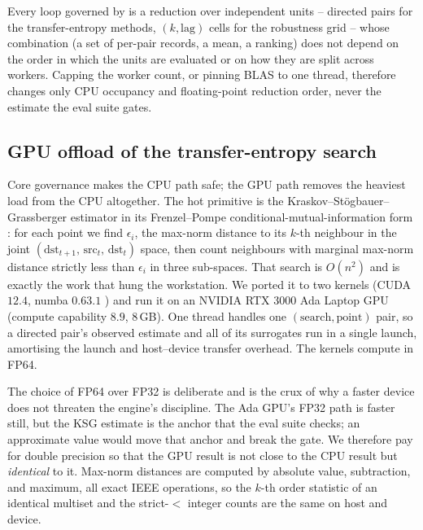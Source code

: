 \begin{invariant}
\label{inv:worker-count}
Every loop governed by  is a reduction over independent units --
directed pairs for the transfer-entropy methods, $(k,\text{lag})$ cells for the
robustness grid -- whose combination (a set of per-pair records, a mean, a ranking)
does not depend on the order in which the units are evaluated or on how they are
split across workers. Capping the worker count, or pinning BLAS to one thread,
therefore changes only CPU occupancy and floating-point reduction order, never the
estimate the eval suite gates.
\end{invariant}

\subsection{GPU offload of the transfer-entropy search}
\label{sec:gpu-offload}

Core governance makes the CPU path safe; the GPU path removes the heaviest load from
the CPU altogether. The hot primitive is the Kraskov--St{\"o}gbauer--Grassberger
estimator in its Frenzel--Pompe conditional-mutual-information form
\citep{kraskov2004,frenzel2007,schreiber2000}: for each point we find $\epsilon_i$,
the max-norm distance to its $k$-th neighbour in the joint
$(\text{dst}_{t+1},\,\text{src}_t,\,\text{dst}_t)$ space, then count neighbours with
marginal max-norm distance strictly less than $\epsilon_i$ in three sub-spaces. That
search is $O(n^2)$ and is exactly the work that hung the workstation. We ported it to
two  kernels (CUDA $12.4$, numba $0.63.1$ \citep{lam2015numba}) and
run it on an NVIDIA RTX 3000 Ada Laptop GPU (compute capability $8.9$, $8$\,GB). One
thread handles one $(\text{search},\text{point})$ pair, so a directed pair's observed
estimate and all of its surrogates run in a single launch, amortising the launch and
host--device transfer overhead. The kernels compute in FP64.

The choice of FP64 over FP32 is deliberate and is the crux of why a faster device does
not threaten the engine's discipline. The Ada GPU's FP32 path is faster still, but the
KSG estimate is the anchor that the eval suite checks; an approximate value would move
that anchor and break the gate. We therefore pay for double precision so that the GPU
result is not close to the CPU result but \emph{identical} to it. Max-norm distances
are computed by absolute value, subtraction, and maximum, all exact IEEE operations,
so the $k$-th order statistic of an identical multiset and the strict-$<$ integer
counts are the same on host and device.

